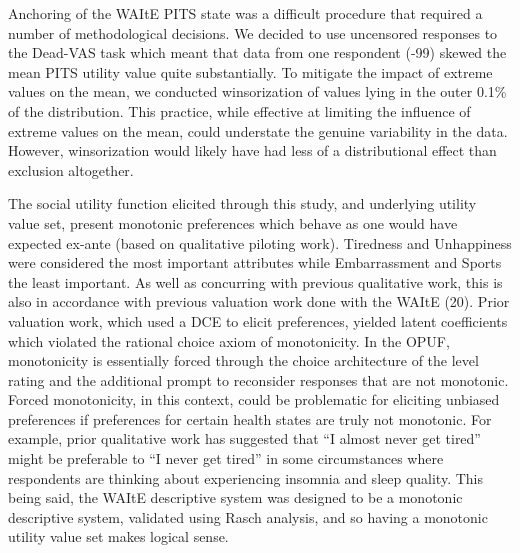 \documentclass[
  letterpaper,
  DIV=11,
  numbers=noendperiod]{scrartcl}
\begin{document}
Anchoring of the WAItE PITS state was a difficult procedure that
required a number of methodological decisions. We decided to use
uncensored responses to the Dead-VAS task which meant that data from one
respondent (-99) skewed the mean PITS utility value quite substantially.
To mitigate the impact of extreme values on the mean, we conducted
winsorization of values lying in the outer 0.1\% of the distribution.
This practice, while effective at limiting the influence of extreme
values on the mean, could understate the genuine variability in the
data. However, winsorization would likely have had less of a
distributional effect than exclusion altogether.

The social utility function elicited through this study, and underlying
utility value set, present monotonic preferences which behave as one
would have expected ex-ante (based on qualitative piloting work).
Tiredness and Unhappiness were considered the most important attributes
while Embarrassment and Sports the least important. As well as
concurring with previous qualitative work, this is also in accordance
with previous valuation work done with the WAItE (20). Prior valuation
work, which used a DCE to elicit preferences, yielded latent
coefficients which violated the rational choice axiom of monotonicity.
In the OPUF, monotonicity is essentially forced through the choice
architecture of the level rating and the additional prompt to reconsider
responses that are not monotonic. Forced monotonicity, in this context,
could be problematic for eliciting unbiased preferences if preferences
for certain health states are truly not monotonic. For example, prior
qualitative work has suggested that ``I almost never get tired'' might
be preferable to ``I never get tired'' in some circumstances where
respondents are thinking about experiencing insomnia and sleep quality.
This being said, the WAItE descriptive system was designed to be a
monotonic descriptive system, validated using Rasch analysis, and so
having a monotonic utility value set makes logical sense.
\end{document}
